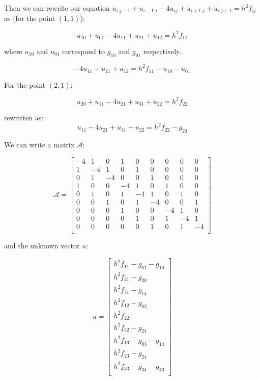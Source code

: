 Then we can rewrite our equation $u_{i\; j-1} + u_{i-1\; j} -4 u_{ij} +  u_{i+1\; j} + u_{i\; j+1} = h^2 f_{ij}$ as (for the point $(1,1)$):

\begin{equation*}
u_{10} + u_{01} - 4u_{11} + u_{21}  + u_{12} = h^2 f_{11}
\end{equation*}

where $u_{10}$ and $u_{01}$ correspond to $g_{10}$ and $g_{01}$ respectively.

\begin{equation*}
- 4u_{11} + u_{21}  + u_{12} = h^2 f_{11} - u_{10} - u_{01}
\end{equation*}

For the point $(2,1)$:

\begin{equation*}
u_{20} + u_{11} - 4u_{21} + u_{31}  + u_{22} = h^2 f_{22}
\end{equation*}

rewritten as:
\begin{equation*}
u_{11} - 4u_{21} + u_{31} + u_{22} = h^2 f_{22} - g_{20}
\end{equation*}

We can write a matrix $\mathcal{A}$:

\begin{equation*}
\mathcal{A} = \begin{bmatrix}
-4 &  1 &  0 &  1 &  0 &  0 &  0 &  0 &  0 \\
 1 & -4 &  1 &  0 &  1 &  0 &  0 &  0 &  0 \\
 0 &  1 & -4 &  0 &  0 &  1 &  0 &  0 &  0 \\
 1 &  0 &  0 & -4 &  1 &  0 &  1 &  0 &  0 \\
 0 &  1 &  0 &  1 & -4 &  1 &  0 &  1 &  0 \\
 0 &  0 &  1 &  0 &  1 & -4 &  0 &  0 &  1 \\
 0 &  0 &  0 &  1 &  0 &  0 & -4 &  1 &  0 \\
 0 &  0 &  0 &  0 &  1 &  0 &  1 & -4 &  1 \\
 0 &  0 &  0 &  0 &  0 &  1 &  0 &  1 & -4 \\
\end{bmatrix}
\end{equation*}

and the unknown vector $u$:

\begin{equation*}
u = \begin{bmatrix}
h^2 f_{11} - g_{01} - g_{10} \\
h^2 f_{21} - g_{20}          \\
h^2 f_{31} - g_{14}          \\
h^2 f_{12} - g_{02}          \\
h^2 f_{22}                   \\
h^2 f_{32} - g_{24}          \\
h^2 f_{13} - g_{03} - g_{14} \\
h^2 f_{23} - g_{24}          \\
h^2 f_{33} - g_{34} - g_{43} \\
\end{bmatrix}
\end{equation*}

